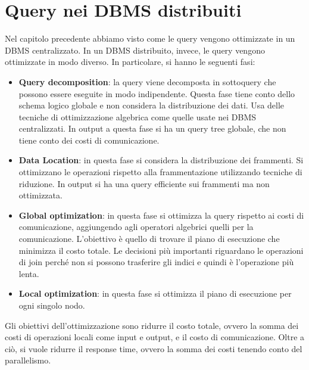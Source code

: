 \section{Query nei DBMS distribuiti}
Nel capitolo precedente abbiamo visto come le query vengono ottimizzate in un
DBMS centralizzato. In un DBMS distribuito, invece, le query vengono ottimizzate
in modo diverso. In particolare, si hanno le seguenti fasi:
\begin{itemize}
      \item \textbf{Query decomposition}: la query viene decomposta in
            sottoquery che possono essere eseguite in modo indipendente. Questa
            fase tiene conto dello schema logico globale e non considera la
            distribuzione dei dati. Usa delle tecniche di ottimizzazione algebrica
            come quelle usate nei DBMS centralizzati.
            In output a questa fase si ha un query tree globale, che non tiene
            conto dei costi di comunicazione.
      \item \textbf{Data Location}: in questa fase si considera la distribuzione
            dei frammenti. Si ottimizzano le operazioni rispetto alla
            frammentazione utilizzando tecniche di riduzione. In output si ha una
            query efficiente sui frammenti ma non ottimizzata.
      \item \textbf{Global optimization}: in questa fase si ottimizza la query
            rispetto ai costi di comunicazione, aggiungendo agli operatori
            algebrici quelli per la comunicazione. L'obiettivo è quello di
            trovare il piano di esecuzione che minimizza il costo totale. Le
            decisioni più importanti riguardano le operazioni di join perché
            non si possono trasferire gli indici e quindi è l'operazione più lenta.
      \item \textbf{Local optimization}: in questa fase si ottimizza il piano di
            esecuzione per ogni singolo nodo.
\end{itemize}
Gli obiettivi dell'ottimizzazione sono ridurre il costo totale, ovvero la somma
dei costi di operazioni locali come input e output, e il costo di comunicazione.
Oltre a ciò, si vuole ridurre il response time, ovvero la somma dei costi tenendo
conto del parallelismo.

